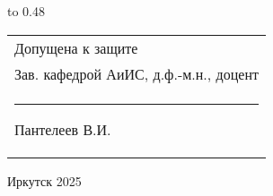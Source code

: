 \vspace{0.8cm}

{
	\noindent\hbox to 0.48\textwidth {%
		\mbox{ } \hfil} %
	\begin{tabular}[t]{l}
		Допущена к защите\\
		Зав. кафедрой АиИС, д.ф.-м.н., доцент \\
		\rule{2.7cm}{0.5pt} Пантелеев В.И.
	\end{tabular}		
}

\vspace{0.8cm}

\vfill 
\noindent
\begin{minipage}{\textwidth}
	\centering	Иркутск 2025
\end{minipage}